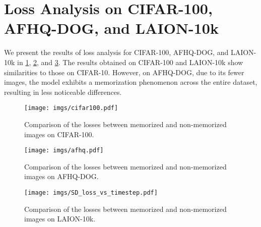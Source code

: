 \appendix
\section*{Loss Analysis on CIFAR-100, AFHQ-DOG, and LAION-10k }
We present the results of loss analysis for CIFAR-100, AFHQ-DOG, and LAION-10k in \cref{fig:cifar100_loss}, \cref{fig:afhq_loss}, and \cref{fig:laion_loss}. 
The results obtained on CIFAR-100 and LAION-10k show similarities to those on CIFAR-10. 
However, on AFHQ-DOG, due to its fewer images, the model exhibits a memorization phenomenon across the entire dataset, resulting in less noticeable differences.
\begin{figure}[t]
  \centering
  \setlength{\abovecaptionskip}{-4pt} %
  \setlength{\belowcaptionskip}{-10pt} %
  \texttt{[image: imgs/cifar100.pdf]}
  \caption{
  Comparison of the losses between memorized and non-memorized images on CIFAR-100. 
  }
  \label{fig:cifar100_loss}
\end{figure}
\begin{figure}[t]
  \centering
  \setlength{\abovecaptionskip}{-4pt} %
  \setlength{\belowcaptionskip}{-10pt} %
  \texttt{[image: imgs/afhq.pdf]}
  \caption{
  Comparison of the losses between memorized and non-memorized images on AFHQ-DOG.
  }
  \label{fig:afhq_loss}
\end{figure}

\vspace*{0pt}
\begin{figure}[t]
  \centering
  \setlength{\abovecaptionskip}{-4pt} %
  \setlength{\belowcaptionskip}{-5pt} %
  \texttt{[image: imgs/SD\_loss\_vs\_timestep.pdf]}
  \caption{
  Comparison of the losses between memorized and non-memorized images on LAION-10k. 
  }
  \label{fig:laion_loss}
\end{figure}

